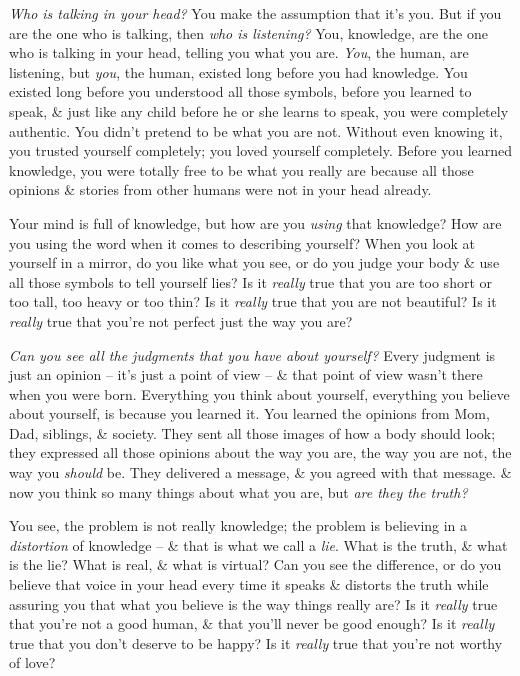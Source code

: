 \documentclass{article}
\numberwithin{equation}{section}
\begin{document}
\textit{Who is talking in your head?} You make the assumption that it's you. But  if you are the one who is talking, then \textit{who is listening?} You, knowledge, are the one who is talking in your head, telling you what you are. \textit{You}, the human, are listening, but \textit{you}, the human, existed long before you had knowledge. You existed long before you understood all those symbols, before you learned to speak, \& just like any child before he or she learns to speak, you were completely authentic. You didn't pretend to be what you are not. Without even knowing it, you trusted yourself completely; you loved yourself completely. Before you learned knowledge, you were totally free to be what you really are because all those opinions \& stories from other humans were not in your head already.

Your mind is full of knowledge, but how are you \textit{using} that knowledge? How are you using the word when it comes to describing yourself? When you look at yourself in a mirror, do you like what you see, or do you judge your body \& use all those symbols to tell yourself lies? Is it \textit{really} true that you are too short or too tall, too heavy or too thin? Is it \textit{really} true that you are not beautiful? Is it \textit{really} true that you're not perfect just the way you are?

\textit{Can you see all the judgments that you have about yourself?} Every judgment is just an opinion -- it's just a point of view -- \& that point of view wasn't there when you were born. Everything you think about yourself, everything you believe about yourself, is because you learned it. You learned the opinions from Mom, Dad, siblings, \& society. They sent all those images of how a body should look; they expressed all those opinions about the way you are, the way you are not, the way you \textit{should} be. They delivered a message, \& you agreed with that message. \& now you think so many things about what you are, but \textit{are they the truth?}

You see, the problem is not really knowledge; the problem is believing in a \textit{distortion} of knowledge -- \& that is what we call a \textit{lie}. What is the truth, \& what is the lie? What is real, \& what is virtual? Can you see the difference, or do you believe that voice in your head every time it speaks \& distorts the  truth while assuring you that what you believe is the way things really are? Is it \textit{really} true that you're not a good human, \& that you'll never be good enough? Is it \textit{really} true that you don't deserve to be happy? Is it \textit{really} true that you're not worthy of love?
\end{document}
